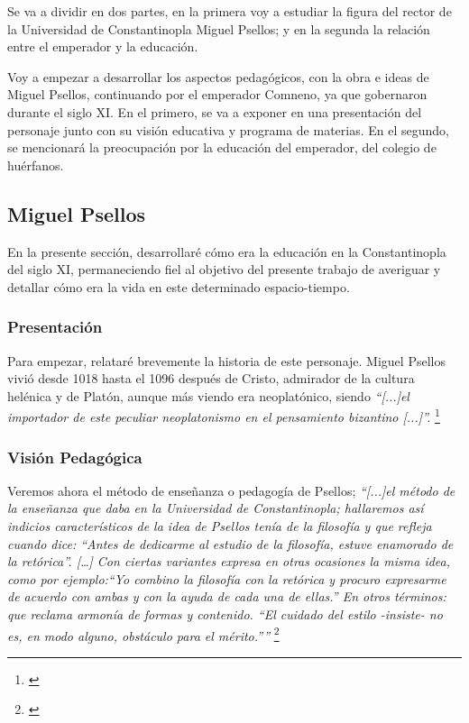 

Se va a dividir en dos partes, en la primera voy a estudiar
la figura del rector de la Universidad de Constantinopla
Miguel Psellos; y en la segunda la relación entre el emperador y la
educación.

Voy a empezar a desarrollar los aspectos pedagógicos, con la obra e 
ideas de Miguel Psellos, continuando por el emperador Comneno, 
ya que gobernaron durante el siglo XI. En el primero, se va a exponer
en una presentación del personaje junto con su visión educativa y 
programa de materias. En el segundo, se mencionará la preocupación por 
la educación del emperador, del colegio de huérfanos.

\subsection{Miguel Psellos}
En la presente sección, desarrollaré cómo era la educación en la 
Constantinopla del siglo XI, permaneciendo fiel al objetivo del 
presente trabajo de averiguar y detallar cómo era la vida en este 
determinado espacio-tiempo.

\subsubsection{Presentación}
Para empezar, relataré brevemente la historia de este personaje. 
Miguel Psellos vivió desde 1018 hasta el 1096 después de Cristo, 
admirador de la cultura helénica y de Platón, aunque más viendo era 
neoplatónico, siendo \textit{“[...]el importador de este peculiar neoplatonismo 
en el pensamiento bizantino [...]”.}
\footnote{\cite[p.~160]{filosofia}}

\subsubsection{Visión Pedagógica}
Veremos ahora el método de enseñanza o pedagogía de Psellos; 
\textit{“[...]el método de la enseñanza que daba en la Universidad de 
Constantinopla; hallaremos así indicios característicos de la idea de 
Psellos tenía de la filosofía y que refleja cuando dice: 
“Antes de dedicarme al estudio de la filosofía, estuve enamorado de 
la retórica”. […] Con ciertas variantes expresa en otras ocasiones 
la misma idea, como por ejemplo:“Yo combino la filosofía con la 
retórica y procuro expresarme de acuerdo con ambas y con la ayuda de 
cada una de ellas.” En otros términos: que reclama armonía de 
formas y contenido. “El cuidado del estilo -insiste- no es, 
en modo alguno, obstáculo para el mérito.””}
\footnote{\cite[p.~160]{filosofia}}

